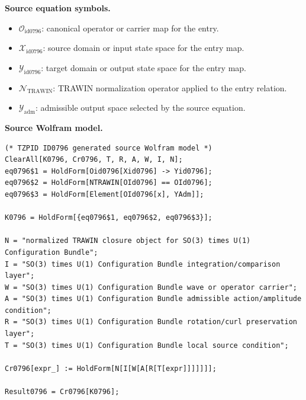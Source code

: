 \begin{minipage}[t]{0.49\linewidth}
\begingroup
\small
\raggedright
\textbf{Source equation symbols.}\par
\begin{itemize}[leftmargin=1.35em,itemsep=1pt,topsep=1pt,parsep=0pt]
    \item $\mathcal{O}_{\mathrm{id0796}}$: canonical operator or carrier map for the entry.
    \item $\mathcal{X}_{\mathrm{id0796}}$: source domain or input state space for the entry map.
    \item $\mathcal{Y}_{\mathrm{id0796}}$: target domain or output state space for the entry map.
    \item $\mathcal{N}_{\mathrm{TRAWIN}}$: TRAWIN normalization operator applied to the entry relation.
    \item $\mathcal{Y}_{\mathrm{adm}}$: admissible output space selected by the source equation.
\end{itemize}
\endgroup
\end{minipage}\hfill
\begin{minipage}[t]{0.47\linewidth}
\begingroup
\scriptsize
\raggedright
\textbf{Source Wolfram model.}\par
\begin{Verbatim}[fontsize=\tiny,breaklines=true,breakanywhere=true]
(* TZPID ID0796 generated source Wolfram model *)
ClearAll[K0796, Cr0796, T, R, A, W, I, N];
eq0796$1 = HoldForm[Oid0796[Xid0796] -> Yid0796];
eq0796$2 = HoldForm[NTRAWIN[OId0796] == OId0796];
eq0796$3 = HoldForm[Element[OId0796[x], YAdm]];

K0796 = HoldForm[{eq0796$1, eq0796$2, eq0796$3}];

N = "normalized TRAWIN closure object for SO(3) times U(1) Configuration Bundle";
I = "SO(3) times U(1) Configuration Bundle integration/comparison layer";
W = "SO(3) times U(1) Configuration Bundle wave or operator carrier";
A = "SO(3) times U(1) Configuration Bundle admissible action/amplitude condition";
R = "SO(3) times U(1) Configuration Bundle rotation/curl preservation layer";
T = "SO(3) times U(1) Configuration Bundle local source condition";

Cr0796[expr_] := HoldForm[N[I[W[A[R[T[expr]]]]]]];

Result0796 = Cr0796[K0796];
\end{Verbatim}
\endgroup
\end{minipage}

